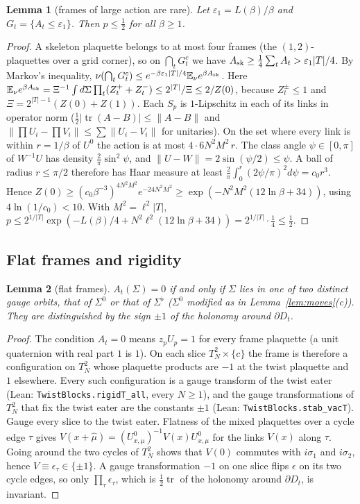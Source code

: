\documentclass[11pt,a4paper]{article}
\newtheorem{lemma}{Lemma}[section]
\theoremstyle{definition}
\theoremstyle{remark}
\newcommand{\E}{\mathbb{E}}
\newcommand{\tr}{\operatorname{tr}}
\newcommand{\code}[1]{\texttt{#1}}
\begin{document}
\begin{lemma}[frames of large action are rare]\label{lem:bad}
Let $\varepsilon_1=L(\beta)/\beta$ and $G_t=\{A_t\le\varepsilon_1\}$. Then $p\le\frac12$ for all $\beta\ge1$.
\end{lemma}
\begin{proof}
A skeleton plaquette belongs to at most four frames (the $(1,2)$-plaquettes over a grid corner), so on $\bigcap_tG_t^c$ we have $A_{\rm sk}\ge\frac14\sum_tA_t>\varepsilon_1|T|/4$.
By Markov's inequality, $\nu(\bigcap_tG_t^c)\le e^{-\beta\varepsilon_1|T|/4}\E_\nu e^{\beta A_{\rm sk}}$.
Here $\E_\nu e^{\beta A_{\rm sk}}=\Xi^{-1}\int d\Sigma\prod_t(Z^+_t+Z^-_t)\le2^{|T|}/\Xi\le2/Z(0)$, because $Z^\pm_t\le1$ and $\Xi=2^{|T|-1}(Z(0)+Z(1))$.
Each $S_p$ is $1$-Lipschitz in each of its links in operator norm ($\frac12|\tr(A-B)|\le\|A-B\|$ and $\|\prod U_i-\prod V_i\|\le\sum\|U_i-V_i\|$ for unitaries).
On the set where every link is within $r=1/\beta$ of $U^0$ the action is at most $4\cdot6N^2M^2\,r$.
The class angle $\psi\in[0,\pi]$ of $W^{-1}U$ has density $\frac2\pi\sin^2\psi$, and $\|U-W\|=2\sin(\psi/2)\le\psi$.
A ball of radius $r\le\pi/2$ therefore has Haar measure at least $\frac2\pi\int_0^r(2\psi/\pi)^2d\psi=c_0r^3$.
Hence $Z(0)\ge(c_0\beta^{-3})^{4N^2M^2}e^{-24N^2M^2}\ge\exp(-N^2M^2(12\ln\beta+34))$, using $4\ln(1/c_0)<10$.
With $M^2=\ell^2|T|$, $p\le2^{1/|T|}\exp(-L(\beta)/4+N^2\ell^2(12\ln\beta+34))=2^{1/|T|}\cdot\frac14\le\frac12$.
\end{proof}

\subsection{Flat frames and rigidity}

\begin{lemma}[flat frames]\label{lem:flat}
$A_t(\Sigma)=0$ if and only if $\Sigma$ lies in one of two distinct gauge orbits, that of $\Sigma^0$ or that of $\Sigma^\flat$ ($\Sigma^0$ modified as in Lemma~\ref{lem:moves}(c)). They are distinguished by the sign $\pm1$ of the holonomy around $\partial D_t$.
\end{lemma}
\begin{proof}
The condition $A_t=0$ means $z_pU_p=1$ for every frame plaquette (a unit quaternion with real part $1$ is $1$).
On each slice $T^2_N\times\{c\}$ the frame is therefore a configuration on $T^2_N$ whose plaquette products are $-1$ at the twist plaquette and $1$ elsewhere. Every such configuration is a gauge transform of the twist eater (Lean: \code{TwistBlocks.rigidT\_all}, every $N\ge1$), and the gauge transformations of $T^2_N$ that fix the twist eater are the constants $\pm1$ (Lean: \code{TwistBlocks.stab\_vacT}).
Gauge every slice to the twist eater. Flatness of the mixed plaquettes over a cycle edge $\tau$ gives $V(x+\hat\mu)=(U^0_{x,\mu})^{-1}V(x)U^0_{x,\mu}$ for the links $V(x)$ along $\tau$.
Going around the two cycles of $T^2_N$ shows that $V(0)$ commutes with $i\sigma_1$ and $i\sigma_2$, hence $V\equiv\epsilon_\tau\in\{\pm1\}$.
A gauge transformation $-1$ on one slice flips $\epsilon$ on its two cycle edges, so only $\prod_\tau\epsilon_\tau$, which is $\frac12\tr$ of the holonomy around $\partial D_t$, is invariant.
\end{proof}
\end{document}
